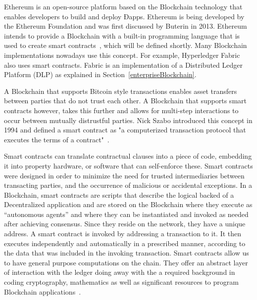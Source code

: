 Ethereum is an open-source platform based on the Blockchain technology that
enables developers to build and deploy Ðapps. Ethereum is being developed by
the Ethereum Foundation and was first discussed by Buterin in 2013. Ethereum
intends to provide a Blockchain with a built-in programming language that is
used to create smart contracts~\cite{Wood2017}, which will be defined shortly.
Many Blockchain implementations nowadays use this concept. For example,
Hyperledger Fabric also uses smart contracts. Fabric is an implementation of a
Distributed Ledger Platform (DLP) as explained in
Section~\ref{enterpriseBlockchain}.

A Blockchain that supports Bitcoin style transactions enables asset transfers
between parties that do not trust each other. A Blockchain that supports smart
contracts however, takes this further and allows for multi-step interactions to
occur between mutually distrustful parties. Nick Szabo introduced this concept
in 1994 and defined a smart contract as "a computerized transaction protocol
that executes the terms of a contract"~\cite{Christidis2016}. 

Smart contracts can translate contractual clauses into a piece of code,
embedding it into property hardware, or software that can self-enforce these.
Smart contracts were designed in order to minimize the need for trusted
intermediaries between transacting parties, and the occurrence of malicious or
accidental exceptions. In a Blockchain, smart contracts are scripts that
describe the logical backed of a Decentralized application and are stored on
the Blockchain where they execute as “autonomous agents” and where they can be
instantiated and invoked as needed after achieving consensus.  Since they
reside on the network, they have a unique address. A smart contract is invoked
by addressing a transaction to it.  It then executes independently and
automatically in a prescribed manner, according to the data that was included
in the invoking transaction. Smart contracts allow us to have general purpose
computations on the chain.  They offer an abstract layer of interaction with
the ledger doing away with the a required background in coding cryptography,
mathematics as well as significant resources to program Blockchain
applications~\cite{Wood2017,BlockGeeks2017}.


